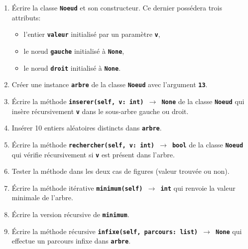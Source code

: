 \documentclass[a4paper,11pt]{article}
\begin{document}
\begin{exo}
    \begin{enumerate}
        \item Écrire la classe \textbf{\texttt{Noeud}} et son constructeur. Ce dernier possédera trois attributs:
              \begin{itemize}
                  \item l'entier \textbf{\texttt{valeur}} initialisé par un paramètre \textbf{\texttt{v}},
                  \item le nœud \textbf{\texttt{gauche}} initialisé à \textbf{\texttt{None}},
                  \item le nœud \textbf{\texttt{droit}} initialisé à \textbf{\texttt{None}}.
              \end{itemize}
        \item Créer une instance \textbf{\texttt{arbre}} de la classe \textbf{\texttt{Noeud}} avec l'argument \textbf{\texttt{13}}.
              \begin{center}
                  \label{noeud}
              \end{center}
        \item Écrire la méthode \textbf{\texttt{inserer(self, v: int) $\rightarrow$ None}} de la classe \textbf{\texttt{Noeud}} qui insère récursivement \textbf{\texttt{v}} dans le sous-arbre gauche ou droit.
        \item Insérer 10 entiers aléatoires distincts dans \textbf{\texttt{arbre}}.
        \item Écrire la méthode \textbf{\texttt{rechercher(self, v: int) $\rightarrow$ bool}} de la classe \textbf{\texttt{Noeud}} qui vérifie récursivement si \textbf{\texttt{v}} est présent dans l'arbre.
        \item Tester la méthode dans les deux cas de figures (valeur trouvée ou non).
        \item Écrire la méthode itérative \textbf{\texttt{minimum(self) $\rightarrow$ int}} qui renvoie la valeur minimale de l'arbre.
        \item Écrire la version récursive de \textbf{\texttt{minimum}}.
        \item Écrire la méthode récursive \textbf{\texttt{infixe(self, parcours: list) $\rightarrow$ None}} qui effectue un parcours infixe dans \textbf{\texttt{arbre}}.
    \end{enumerate}
\end{exo}
\end{document}
